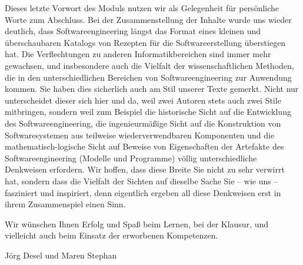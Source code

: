 Dieses letzte Vorwort des Moduls nutzen wir als Gelegenheit für persönliche Worte zum Abschluss. Bei der Zusammenstellung der Inhalte wurde uns wieder deutlich, dass Softwareengineering längst das Format eines kleinen und überschaubaren Katalogs von Rezepten für die Softwareerstellung überstiegen hat. Die Verflechtungen zu anderen Informatikbereichen sind immer mehr gewachsen, und insbesondere auch die Vielfalt der wissenschaftlichen Methoden, die in den unterschiedlichen Bereichen von Softwareengineering zur Anwendung kommen. Sie haben dies sicherlich auch am Stil unserer Texte gemerkt. Nicht nur unterscheidet dieser sich hier und da, weil zwei Autoren stets auch zwei Stile mitbringen, sondern weil zum Beispiel die historische Sicht auf die Entwicklung des Softwareengineering, die ingenieurmäßige Sicht auf die Konstruktion von Softwaresystemen aus teilweise wiederverwendbaren Komponenten und die mathematisch-logische Sicht auf Beweise von Eigenschaften der Artefakte des Softwareengineering (Modelle und Programme) völlig unterschiedliche Denkweisen erfordern. Wir hoffen, dass diese Breite Sie nicht zu sehr verwirrt hat, sondern dass die Vielfalt der Sichten auf dieselbe Sache Sie -- wie uns -- fasziniert und inspiriert, denn eigentlich ergeben all diese Denkweisen erst in ihrem Zusammenspiel einen Sinn.

Wir wünschen Ihnen Erfolg und Spaß beim Lernen, bei der Klausur, und vielleicht auch beim Einsatz der erworbenen Kompetenzen.

Jörg Desel und Maren Stephan  

\newpage


